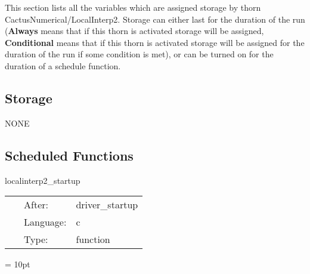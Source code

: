 \noindent This section lists all the variables which are assigned storage by thorn CactusNumerical/LocalInterp2.  Storage can either last for the duration of the run ({\bf Always} means that if this thorn is activated storage will be assigned, {\bf Conditional} means that if this thorn is activated storage will be assigned for the duration of the run if some condition is met), or can be turned on for the duration of a schedule function.


\subsection*{Storage}NONE
\subsection*{Scheduled Functions}
\vspace{5mm}


\hspace{5mm} localinterp2\_startup 

\hspace{5mm}{\it register localinterp2's interpolation operators } 


\hspace{5mm}

 \begin{tabular*}{160mm}{cll} 
~ & After:  & driver\_startup \\ 
~ & Language:  & c \\ 
~ & Type:  & function \\ 
\end{tabular*} 



\vspace{5mm}\parskip = 10pt 

